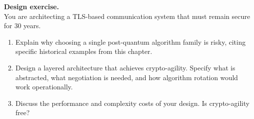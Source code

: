 \begin{prob}
\label{prob:ch11-agility}
\textbf{Design exercise.}\\
You are architecting a TLS-based communication system that must remain secure for 30 years.
\begin{enumerate}
\item[(a)] Explain why choosing a single post-quantum algorithm family is risky, citing specific historical examples from this chapter.
\item[(b)] Design a layered architecture that achieves crypto-agility.  Specify what is abstracted, what negotiation is needed, and how algorithm rotation would work operationally.
\item[(c)] Discuss the performance and complexity costs of your design.  Is crypto-agility free?
\end{enumerate}
\end{prob}
